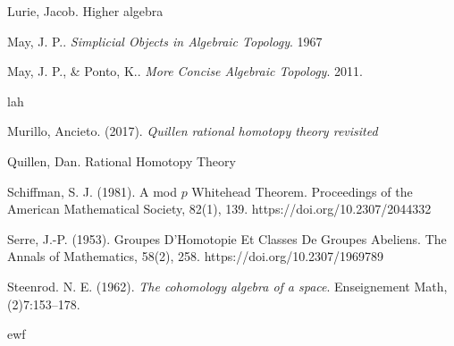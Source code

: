 \documentclass[psamsfonts]{amsart}
\theoremstyle{definition}
\theoremstyle{remark}
\numberwithin{equation}{section}
\begin{document}
\begin{thebibliography}{2}
 Lurie, Jacob. Higher algebra

 May, J. P.. \textit{Simplicial Objects in Algebraic Topology}. 1967

May, J. P., \& Ponto, K.. \textit{More Concise Algebraic Topology}. 2011.

 lah

 Murillo, Ancieto. (2017). \textit{Quillen rational homotopy theory revisited}

 Quillen, Dan. Rational Homotopy Theory

Schiffman, S. J. (1981). A mod $p$ Whitehead Theorem. Proceedings of the American Mathematical Society, 82(1), 139. https://doi.org/10.2307/2044332 

Serre, J.-P. (1953). Groupes D'Homotopie Et Classes De Groupes Abeliens. The Annals of Mathematics, 58(2), 258. https://doi.org/10.2307/1969789 

Steenrod. N. E. (1962). \textit{The cohomology algebra of a space}. Enseignement Math, (2)7:153–178.

 ewf

\end{thebibliography}
\end{document}
